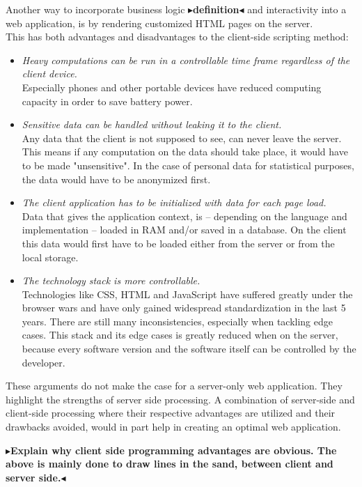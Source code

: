 \documentclass[twoside,11pt,openright]{report}
\newcommand{\todo}[1]{{\color[rgb]{.5,0,0}\textbf{$\blacktriangleright$#1$\blacktriangleleft$}}}
\begin{document}
Another way to incorporate business logic \todo{definition} and
interactivity into a web application, is by rendering customized HTML pages
on the server.\\
This has both advantages and disadvantages to the client-side scripting method:
\begin{itemize}
	\item \emph{Heavy computations can be run in a controllable time frame regardless
	of the client device.}\\
		Especially phones and other portable devices have reduced computing
		capacity in order to save battery power.
	\item \emph{Sensitive data can be handled without leaking it to the
	client.}\\
		Any data that the client is not supposed to see, can never leave the
		server. This means if any computation on the data should take place,
		it would have to be made "unsensitive". In the case of personal data
		for statistical purposes, the data would have to be anonymized first.
	\item \emph{The client application has to be initialized with data for each
	page load.}\\
		Data that gives the application context, is -- depending on the language
		and implementation -- loaded in RAM and/or saved in a database. On the
		client this data would first have to be loaded either from the server or
		from the local storage.
	\item \emph{The technology stack is more controllable.}\\
		Technologies like CSS, HTML and JavaScript have suffered greatly under
		the browser wars and have only gained widespread standardization in the
		last 5 years. There are still many inconsistencies, especially when
		tackling edge cases. This stack and its edge cases is greatly reduced when
		on the server, because every software version and the software itself can
		be controlled by the developer.
\end{itemize}

These arguments do not make the case for a server-only web application.
They highlight the strengths of server side processing. A combination of
server-side and client-side processing where their respective advantages
are utilized and their drawbacks avoided, would in part help in creating
an optimal web application.

\todo{Explain why client side programming advantages are obvious.
The above is mainly done to draw lines in the sand, between client
and server side.}
\end{document}
